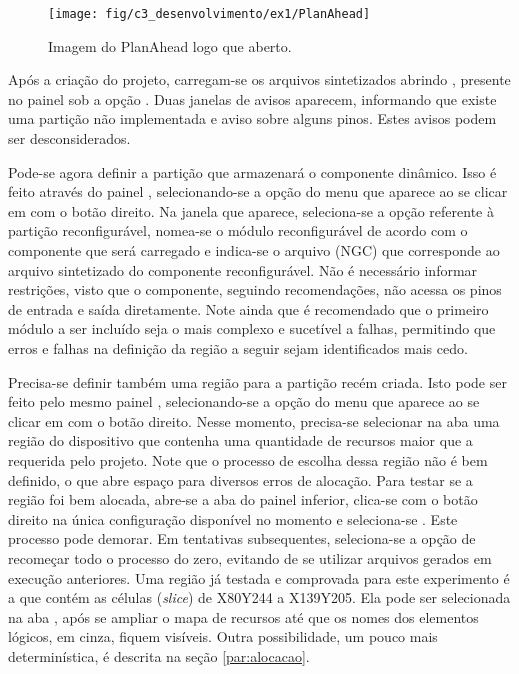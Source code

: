 \documentclass[11pt,a4paper,oneside]{book}
\begin{document}
\begin{figure}[h]
\centering
\texttt{[image: fig/c3\_desenvolvimento/ex1/PlanAhead]}
\caption{Imagem do PlanAhead logo que aberto.}
\label{fig:ex1:planahead}
\end{figure}

Após a criação do projeto, carregam-se os arquivos sintetizados abrindo , presente no painel  sob a opção .
Duas janelas de avisos aparecem, informando que existe uma partição não implementada e aviso sobre alguns pinos.
Estes avisos podem ser desconsiderados.

Pode-se agora definir a partição que armazenará o componente dinâmico.
Isso é feito através do painel , selecionando-se a opção  do menu que aparece ao se clicar em  com o botão direito.
Na janela que aparece, seleciona-se a opção referente à partição reconfigurável, nomea-se o módulo reconfigurável de acordo com o componente que será carregado e indica-se o arquivo (NGC) que corresponde ao arquivo sintetizado do componente reconfigurável.
Não é necessário informar restrições, visto que o componente, seguindo recomendações, não acessa os pinos de entrada e saída diretamente.
Note ainda que é recomendado que o primeiro módulo a ser incluído seja o mais complexo e sucetível a falhas, permitindo que erros e falhas na definição da região a seguir sejam identificados mais cedo.

Precisa-se definir também uma região para a partição recém criada.
Isto pode ser feito pelo mesmo painel , selecionando-se a opção  do menu que aparece ao se clicar em  com o botão direito.
Nesse momento, precisa-se selecionar na aba  uma região do dispositivo que contenha uma quantidade de recursos maior que a requerida pelo projeto.
Note que o processo de escolha dessa região não é bem definido, o que abre espaço para diversos erros de alocação.
Para testar se a região foi bem alocada, abre-se a aba  do painel inferior, clica-se com o botão direito na única configuração disponível no momento e seleciona-se .
Este processo pode demorar.
Em tentativas subsequentes, seleciona-se a opção de recomeçar todo o processo do zero, evitando de se utilizar arquivos gerados em execução anteriores.
Uma região já testada e comprovada para este experimento é a que contém as células (\textit{slice}) de X80Y244 a X139Y205.
Ela pode ser selecionada na aba , após se ampliar o mapa de recursos até que os nomes dos elementos lógicos, em cinza, fiquem visíveis.
Outra possibilidade, um pouco mais determinística, é descrita na seção \ref{par:alocacao}.
\end{document}
